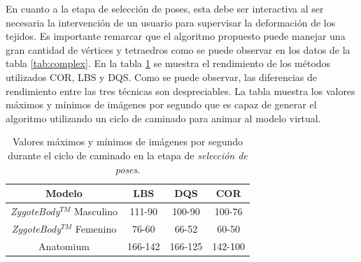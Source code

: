 En cuanto a la etapa de selección de poses, esta debe ser interactiva al ser necesaria la intervención de un usuario para supervisar la deformación de los tejidos. Es importante remarcar que el algoritmo propuesto puede manejar una gran cantidad de vértices y tetraedros como se puede observar en los datos de la tabla \ref{tab:complex}. En la tabla \ref{tab:inter} se muestra el rendimiento de los métodos utilizados \ac{COR}, \ac{LBS} y \ac{DQS}. Como se puede observar, las diferencias de rendimiento entre las tres técnicas son despreciables. La tabla muestra los valores máximos y mínimos de imágenes por segundo que es capaz de generar el algoritmo utilizando un ciclo de caminado para animar al modelo virtual.
%
\begin{table}[ht]
\centering
\caption{Valores máximos y mínimos de imágenes por segundo durante el ciclo de caminado en la etapa de \emph{selección de poses}.}
\begin{tabular}{|c|c|c|c|}
\hline
\textbf{Modelo}&\textbf{LBS} &\textbf{DQS} &\textbf{COR} \\ 
\hline
\emph{ZygoteBody}$^{TM}$ Masculino  & 111-90 & 100-90 & 100-76\\ 
\hline
\emph{ZygoteBody}$^{TM}$ Femenino  & 76-60  & 66-52   & 60-50 \\ 
\hline
Anatomium   & 166-142 & 166-125 & 142-100\\ 
\hline
\end{tabular}
\label{tab:inter}
\end{table}









